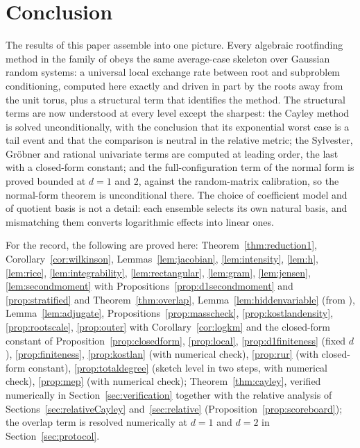 \section{Conclusion}\label{sec:conclusion}

The results of this paper assemble into one picture. Every algebraic rootfinding method
in the family of \cite{graf2026numerical,noferini2016numerical} obeys the same
average-case skeleton over Gaussian random systems: a universal local exchange rate
between root and subproblem conditioning, computed here exactly and driven in part by
the roots away from the unit torus, plus a structural term that identifies the method.
The structural terms are now understood at every level except the sharpest: the Cayley
method is solved unconditionally, with the conclusion that its exponential worst case is
a tail event and that the comparison is neutral in the relative metric; the Sylvester,
Gr\"obner and rational univariate terms are computed at leading order, the last with a
closed-form constant; and the full-configuration term of the normal form is proved
bounded at $d=1$ and $2$, against the random-matrix calibration, so the normal-form
theorem is unconditional there. The choice of coefficient model and of quotient basis is
not a detail: each ensemble selects its own natural basis, and mismatching them converts
logarithmic effects into linear ones.

For the record, the following are proved here: Theorem~\ref{thm:reduction1},
Corollary~\ref{cor:wilkinson}, Lemmas~\ref{lem:jacobian}, \ref{lem:intensity},
\ref{lem:h}, \ref{lem:rice}, \ref{lem:integrability}, \ref{lem:rectangular},
\ref{lem:gram}, \ref{lem:jensen}, \ref{lem:secondmoment} with
Propositions~\ref{prop:d1secondmoment} and \ref{prop:stratified} and
Theorem~\ref{thm:overlap}, Lemma~\ref{lem:hiddenvariable} (from
\cite{noferini2016numerical}), Lemma~\ref{lem:adjugate},
Propositions~\ref{prop:masscheck}, \ref{prop:kostlandensity}, \ref{prop:rootscale},
\ref{prop:outer} with Corollary~\ref{cor:logkm} and the closed-form constant of
Proposition~\ref{prop:closedform}, \ref{prop:local}, \ref{prop:d1finiteness} (fixed
$d$), \ref{prop:finiteness}, \ref{prop:kostlan} (with numerical check),
\ref{prop:rur} (with closed-form constant), \ref{prop:totaldegree} (sketch level in two
steps, with numerical check), \ref{prop:mep} (with numerical check);
Theorem~\ref{thm:cayley}, verified numerically in Section~\ref{sec:verification}
together with the relative analysis of Sections~\ref{sec:relativeCayley}
and~\ref{sec:relative} (Proposition~\ref{prop:scoreboard}); the overlap term is
resolved numerically at $d=1$ and $d=2$ in Section~\ref{sec:protocol}.

